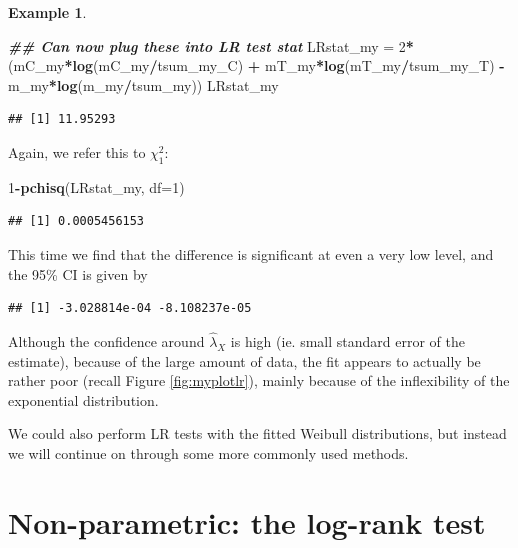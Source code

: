 \documentclass[
  openany]{book}
\newenvironment{Shaded}{\begin{snugshade}}{\end{snugshade}}
\newcommand{\AttributeTok}[1]{\textcolor[rgb]{0.13,0.29,0.53}{#1}}
\newcommand{\DecValTok}[1]{\textcolor[rgb]{0.00,0.00,0.81}{#1}}
\newcommand{\DocumentationTok}[1]{\textcolor[rgb]{0.56,0.35,0.01}{\textbf{\textit{#1}}}}
\newcommand{\FunctionTok}[1]{\textcolor[rgb]{0.13,0.29,0.53}{\textbf{#1}}}
\newcommand{\NormalTok}[1]{#1}
\newcommand{\OtherTok}[1]{\textcolor[rgb]{0.56,0.35,0.01}{#1}}
\newcommand{\SpecialCharTok}[1]{\textcolor[rgb]{0.81,0.36,0.00}{\textbf{#1}}}
\theoremstyle{definition}
\theoremstyle{definition}
\newtheorem{example}{Example}[chapter]
\theoremstyle{definition}
\theoremstyle{definition}
\theoremstyle{remark}
\begin{document}
\begin{example}
\begin{Shaded}
\begin{Highlighting}[]
\DocumentationTok{\#\# Can now plug these into LR test stat}
\NormalTok{LRstat\_my }\OtherTok{=}  \DecValTok{2}\SpecialCharTok{*}\NormalTok{(mC\_my}\SpecialCharTok{*}\FunctionTok{log}\NormalTok{(mC\_my}\SpecialCharTok{/}\NormalTok{tsum\_my\_C) }\SpecialCharTok{+}\NormalTok{ mT\_my}\SpecialCharTok{*}\FunctionTok{log}\NormalTok{(mT\_my}\SpecialCharTok{/}\NormalTok{tsum\_my\_T) }\SpecialCharTok{{-}}\NormalTok{ m\_my}\SpecialCharTok{*}\FunctionTok{log}\NormalTok{(m\_my}\SpecialCharTok{/}\NormalTok{tsum\_my))}
\NormalTok{LRstat\_my}
\end{Highlighting}
\end{Shaded}

\begin{verbatim}
## [1] 11.95293
\end{verbatim}

Again, we refer this to \(\chi^2_1\):

\begin{Shaded}
\begin{Highlighting}[]
\DecValTok{1}\SpecialCharTok{{-}}\FunctionTok{pchisq}\NormalTok{(LRstat\_my, }\AttributeTok{df=}\DecValTok{1}\NormalTok{)}
\end{Highlighting}
\end{Shaded}

\begin{verbatim}
## [1] 0.0005456153
\end{verbatim}

This time we find that the difference is significant at even a very low level, and the 95\% CI is given by

\begin{verbatim}
## [1] -3.028814e-04 -8.108237e-05
\end{verbatim}

Although the confidence around \(\hat\lambda_X\) is high (ie. small standard error of the estimate), because of the large amount of data, the fit appears to actually be rather poor (recall Figure \ref{fig:myplotlr}), mainly because of the inflexibility of the exponential distribution.
\end{example}

We could also perform LR tests with the fitted Weibull distributions, but instead we will continue on through some more commonly used methods.

\hypertarget{non-parametric-the-log-rank-test}{%
\section{Non-parametric: the log-rank test}\label{non-parametric-the-log-rank-test}}
\end{document}
